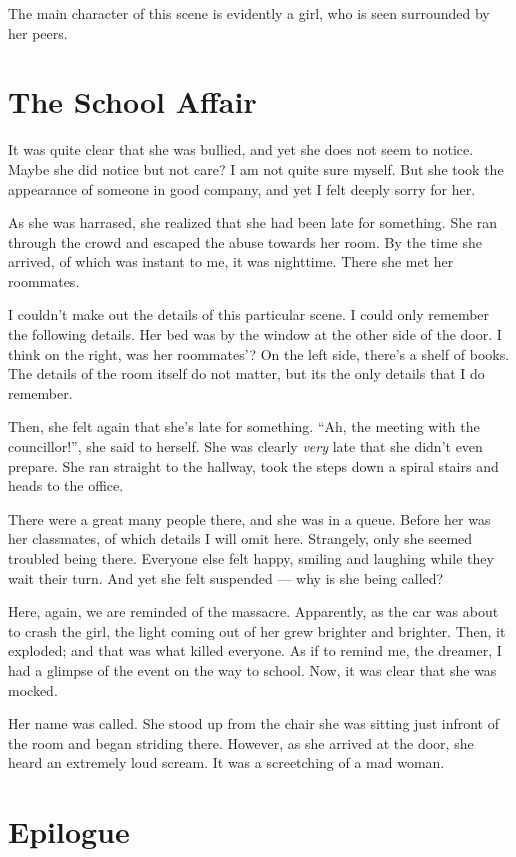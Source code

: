 \documentclass[a4paper,10pt]{article}
\begin{document}
The main character of this scene is evidently a girl, who is seen surrounded by her peers.

\section{The School Affair}

It was quite clear that she was bullied, and yet she does not seem to notice.
Maybe she did notice but not care?
I am not quite sure myself.
But she took the appearance of someone in good company, and yet I felt deeply sorry for her.

As she was harrased, she realized that she had been late for something.
She ran through the crowd and escaped the abuse towards her room.
By the time she arrived, of which was instant to me, it was nighttime.
There she met her roommates.

I couldn't make out the details of this particular scene.
I could only remember the following details.
Her bed was by the window at the other side of the door.
I think on the right, was her roommates'?
On the left side, there's a shelf of books.
The details of the room itself do not matter, but its the only details that I do remember.

Then, she felt again that she's late for something.
``Ah, the meeting with the councillor!'', she said to herself.
She was clearly \textit{very} late that she didn't even prepare.
She ran straight to the hallway, took the steps down a spiral stairs and heads to the office.

There were a great many people there, and she was in a queue.
Before her was her classmates, of which details I will omit here.
Strangely, only she seemed troubled being there.
Everyone else felt happy, smiling and laughing while they wait their turn.
And yet she felt suspended --- why is she being called?

Here, again, we are reminded of the massacre.
Apparently, as the car was about to crash the girl, the light coming out of her grew brighter and brighter.
Then, it exploded; and that was what killed everyone.
As if to remind me, the dreamer, I had a glimpse of the event on the way to school.
Now, it was clear that she was mocked.

Her name was called.
She stood up from the chair she was sitting just infront of the room and began striding there.
However, as she arrived at the door, she heard an extremely loud scream.
It was a screetching of a mad woman.

\section{Epilogue}
\end{document}
